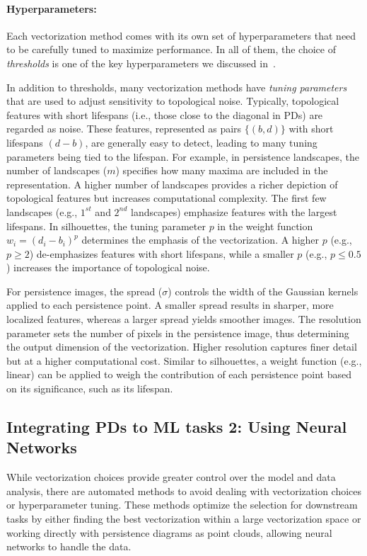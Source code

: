 \paragraph*{Hyperparameters: } Each vectorization method comes with its own set of hyperparameters that need to be carefully tuned to maximize performance. In all of them, the choice of \textit{thresholds} is one of the key hyperparameters we discussed in~.

In addition to thresholds, many vectorization methods have \textit{tuning parameters} that are used to adjust sensitivity to topological noise. Typically, topological features with short lifespans (i.e., those close to the diagonal in PDs) are regarded as noise. These features, represented as pairs \(\{(b,d)\}\) with short lifespans \((d-b)\), are generally easy to detect, leading to many tuning parameters being tied to the lifespan.
For example, in persistence landscapes, the number of landscapes (\(m\)) specifies how many maxima are included in the representation. A higher number of landscapes provides a richer depiction of topological features but increases computational complexity. The first few landscapes (e.g., \(1^{st}\) and \(2^{nd}\) landscapes) emphasize features with the largest lifespans.
In silhouettes, the tuning parameter \(p\) in the weight function \(w_i = (d_i - b_i)^p\) determines the emphasis of the vectorization. A higher \(p\) (e.g., \(p \geq 2\)) de-emphasizes features with short lifespans, while a smaller \(p\) (e.g., \(p \leq 0.5\)) increases the importance of topological noise.

For persistence images, the spread (\(\sigma\)) controls the width of the Gaussian kernels applied to each persistence point. A smaller spread results in sharper, more localized features, whereas a larger spread yields smoother images. The resolution parameter sets the number of pixels in the persistence image, thus determining the output dimension of the vectorization. Higher resolution captures finer detail but at a higher computational cost. Similar to silhouettes, a weight function (e.g., linear) can be applied to weigh the contribution of each persistence point based on its significance, such as its lifespan.


\subsection{Integrating PDs to ML tasks 2: Using Neural Networks} \label{sec:vecNN}

While vectorization choices provide greater control over the model and data analysis, there are automated methods to avoid dealing with vectorization choices or hyperparameter tuning. These methods optimize the selection for downstream tasks by either finding the best vectorization within a large vectorization space or working directly with persistence diagrams as point clouds, allowing neural networks to handle the data.

